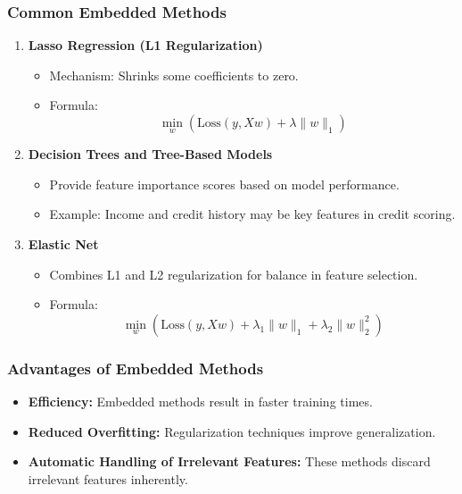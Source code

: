 \documentclass[aspectratio=169]{beamer}
\begin{document}
\begin{frame}[fragile]
    \frametitle{Common Embedded Methods}
    \begin{enumerate}
        \item \textbf{Lasso Regression (L1 Regularization)}
            \begin{itemize}
                \item Mechanism: Shrinks some coefficients to zero.
                \item Formula: 
                \[
                \min_{w} \left( \text{Loss}(y, Xw) + \lambda \|w\|_1 \right)
                \]
            \end{itemize}
        
        \item \textbf{Decision Trees and Tree-Based Models}
            \begin{itemize}
                \item Provide feature importance scores based on model performance.
                \item Example: Income and credit history may be key features in credit scoring.
            \end{itemize}

        \item \textbf{Elastic Net}
            \begin{itemize}
                \item Combines L1 and L2 regularization for balance in feature selection.
                \item Formula: 
                \[
                \min_{w} \left( \text{Loss}(y, Xw) + \lambda_1 \|w\|_1 + \lambda_2 \|w\|_2^2 \right)
                \]
            \end{itemize}
    \end{enumerate}
\end{frame}

\begin{frame}[fragile]
    \frametitle{Advantages of Embedded Methods}
    \begin{itemize}
        \item \textbf{Efficiency:} Embedded methods result in faster training times.
        \item \textbf{Reduced Overfitting:} Regularization techniques improve generalization.
        \item \textbf{Automatic Handling of Irrelevant Features:} These methods discard irrelevant features inherently.
    \end{itemize}
\end{frame}
\end{document}
